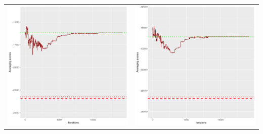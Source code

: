 \documentclass[]{scrartcl}
\begin{document}
\begin{table}[h!]
\begin{tabular}{cc}
\includegraphics[scale = 0.4]{./figs/win95pts/v2/25/avgBoundsEvolution-14252.pdf} & 
\includegraphics[scale = 0.4]{./figs/win95pts/v2/50/avgBoundsEvolution-14252.pdf} \\

\end{tabular}
\end{table}
\end{document}
